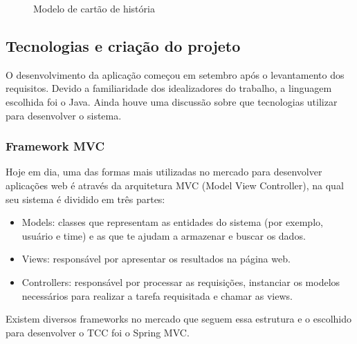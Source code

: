 \begin{figure}[H]
  \centering
  \caption{Modelo de cartão de história}\label{figura:cartao}
\end{figure}

\subsection{Tecnologias e criação do projeto}

O desenvolvimento da aplicação começou em setembro após o levantamento dos requisitos. Devido a familiaridade dos idealizadores do trabalho, a linguagem escolhida foi o Java. Ainda houve uma discussão sobre que tecnologias utilizar para desenvolver o sistema.

\subsubsection*{Framework MVC}

Hoje em dia, uma das formas mais utilizadas no mercado para desenvolver aplicações web é através da arquitetura MVC (Model View Controller), na qual seu sistema é dividido em três partes:

\begin{itemize}
	\item Models: classes que representam as entidades do sistema (por exemplo, usuário e time) e as que te ajudam a armazenar e buscar os dados.
	\item Views: responsável por apresentar os resultados na página web.
	\item Controllers: responsável por processar as requisições, instanciar os modelos necessários para realizar a tarefa requisitada e chamar as views.
\end{itemize}

Existem diversos frameworks no mercado que seguem essa estrutura e o escolhido para desenvolver o TCC foi o Spring MVC.

